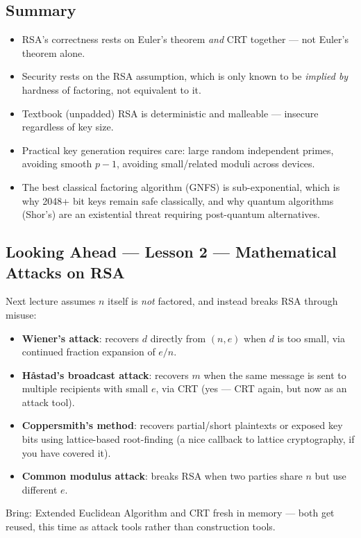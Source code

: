 \subsection*{Summary}
\begin{itemize}
\item RSA's correctness rests on Euler's theorem \emph{and} CRT together — not Euler's theorem alone.
\item Security rests on the RSA assumption, which is only known to be \emph{implied by} hardness of factoring, not equivalent to it.
\item Textbook (unpadded) RSA is deterministic and malleable — insecure regardless of key size.
\item Practical key generation requires care: large random independent primes, avoiding smooth $p-1$, avoiding small/related moduli across devices.
\item The best classical factoring algorithm (GNFS) is sub-exponential, which is why 2048+ bit keys remain safe classically, and why quantum algorithms (Shor's) are an existential threat requiring post-quantum alternatives.
\end{itemize}

\subsection*{Looking Ahead --- Lesson 2 — Mathematical Attacks on RSA}
Next lecture assumes $n$ itself is \emph{not} factored, and instead breaks RSA through misuse:
\begin{itemize}
\item \textbf{Wiener's attack}: recovers $d$ directly from $(n,e)$ when $d$ is too small, via continued fraction expansion of $e/n$.
\item \textbf{Håstad's broadcast attack}: recovers $m$ when the same message is sent to multiple recipients with small $e$, via CRT (yes — CRT again, but now as an attack tool).
\item \textbf{Coppersmith's method}: recovers partial/short plaintexts or exposed key bits using lattice-based root-finding (a nice callback to lattice cryptography, if you have covered it).
\item \textbf{Common modulus attack}: breaks RSA when two parties share $n$ but use different $e$.
\end{itemize}
Bring: Extended Euclidean Algorithm and CRT fresh in memory — both get reused, this time as attack tools rather than construction tools.

